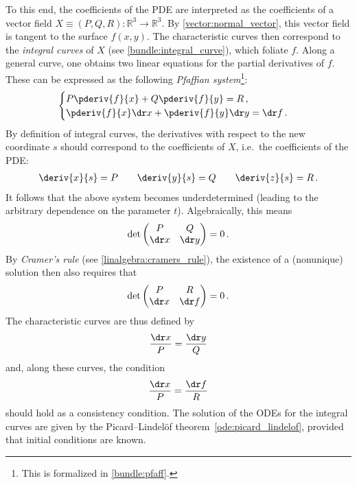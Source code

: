 {        To this end, the coefficients of the PDE are interpreted as the coefficients of a vector field $X\equiv(P,Q,R):\mathbb{R}^3\rightarrow\mathbb{R}^3$. By \cref{vector:normal_vector}, this vector field is tangent to the surface $f(x,y)$. The characteristic curves then correspond to the \textit{integral curves} of $X$ (see \cref{bundle:integral_curve}), which foliate $f$. Along a general curve, one obtains two linear equations for the partial derivatives of $f$. These can be expressed as the following \textit{Pfaffian system}\footnote{This is formalized in \cref{bundle:pfaff}.}:
        \begin{gather}
            \begin{cases}
                \displaystyle P\pderiv{f}{x}+Q\pderiv{f}{y} = R\,,\\
                \displaystyle \pderiv{f}{x}\dr x+\pderiv{f}{y}\dr y = \dr f\,.
            \end{cases}
        \end{gather}
        By definition of integral curves, the derivatives with respect to the new coordinate $s$ should correspond to the coefficients of $X$, i.e.~the coefficients of the PDE:
        \begin{gather}
            \deriv{x}{s} = P\qquad\deriv{y}{s} = Q\qquad\deriv{z}{s} = R\,.
        \end{gather}
        It follows that the above system becomes underdetermined (leading to the arbitrary dependence on the parameter $t$). Algebraically, this means
        \begin{gather}
            \det
            \begin{pmatrix}
                P&Q\\
                \dr x&\dr y
            \end{pmatrix}
            =0\,.
        \end{gather}
        By \textit{Cramer's rule} (see \cref{linalgebra:cramers_rule}), the existence of a (nonunique) solution then also requires that
        \begin{gather}
            \det
            \begin{pmatrix}
                P&R\\
                \dr x&\dr f
            \end{pmatrix}
            =0\,.
        \end{gather}
        The characteristic curves are thus defined by
        \begin{gather}
            \frac{\dr x}{P} = \frac{\dr y}{Q}
        \end{gather}
        and, along these curves, the condition
        \begin{gather}
            \frac{\dr x}{P} = \frac{\dr f}{R}
        \end{gather}
        should hold as a consistency condition. The solution of the ODEs for the integral curves are given by the Picard--Lindel\"of theorem~\ref{ode:picard_lindelof}, provided that initial conditions are known.
    }

